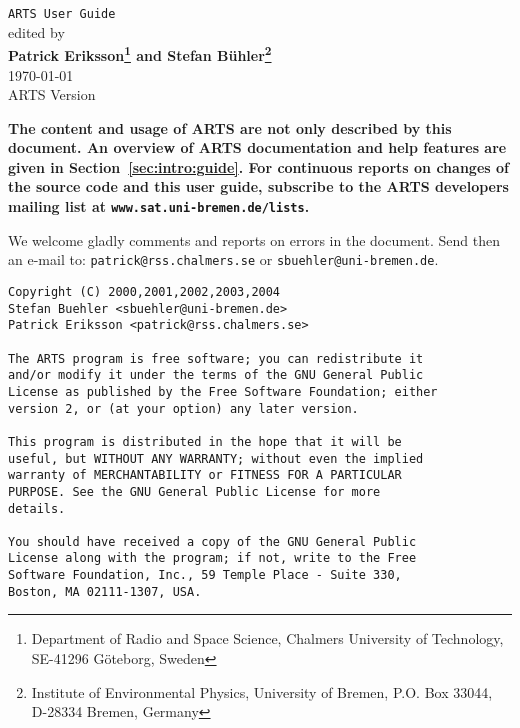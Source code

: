 





%
\renewcommand{\thepage}{title \arabic{page}} 

\thispagestyle{plain}
\begin{center}
  \vspace*{2cm}
  {\Huge \verb|ARTS User Guide|\\}
  \vspace*{1cm}
  {\large edited by \\}
  \vspace*{1cm}
  {\Large \bf Patrick Eriksson\footnote{
      Department of Radio and Space Science, 
      Chalmers University of Technology, SE-41296 G\"oteborg, Sweden} 
      and
    Stefan B\"uhler\footnote{
      Institute of Environmental Physics, University of Bremen, 
      P.O. Box 33044, D-28334 Bremen, Germany}  
    }\\
   \vspace*{2cm}
   {\large \today\\
    ARTS Version 
   }
\end{center}
\vspace*{4cm}
{\normalsize \bf
  \noindent
  The content and usage of ARTS are not only described by this
  document. An overview of ARTS documentation and help features are
  given in Section~\ref{sec:intro:guide}. For continuous reports on
  changes of the source code and this user guide, subscribe to the
  ARTS developers mailing list at \verb|www.sat.uni-bremen.de/lists|.

  We welcome gladly comments and reports on errors in the document.
  Send then an e-mail to: \verb|patrick@rss.chalmers.se| or 
  \verb|sbuehler@uni-bremen.de|.
}

\newpage                          
\thispagestyle{empty}
\vspace*{\fill}
\noindent
\begin{verbatim}
Copyright (C) 2000,2001,2002,2003,2004
Stefan Buehler <sbuehler@uni-bremen.de>
Patrick Eriksson <patrick@rss.chalmers.se>

The ARTS program is free software; you can redistribute it
and/or modify it under the terms of the GNU General Public
License as published by the Free Software Foundation; either
version 2, or (at your option) any later version.

This program is distributed in the hope that it will be
useful, but WITHOUT ANY WARRANTY; without even the implied
warranty of MERCHANTABILITY or FITNESS FOR A PARTICULAR
PURPOSE. See the GNU General Public License for more
details. 

You should have received a copy of the GNU General Public
License along with the program; if not, write to the Free
Software Foundation, Inc., 59 Temple Place - Suite 330,
Boston, MA 02111-1307, USA. 
\end{verbatim}



